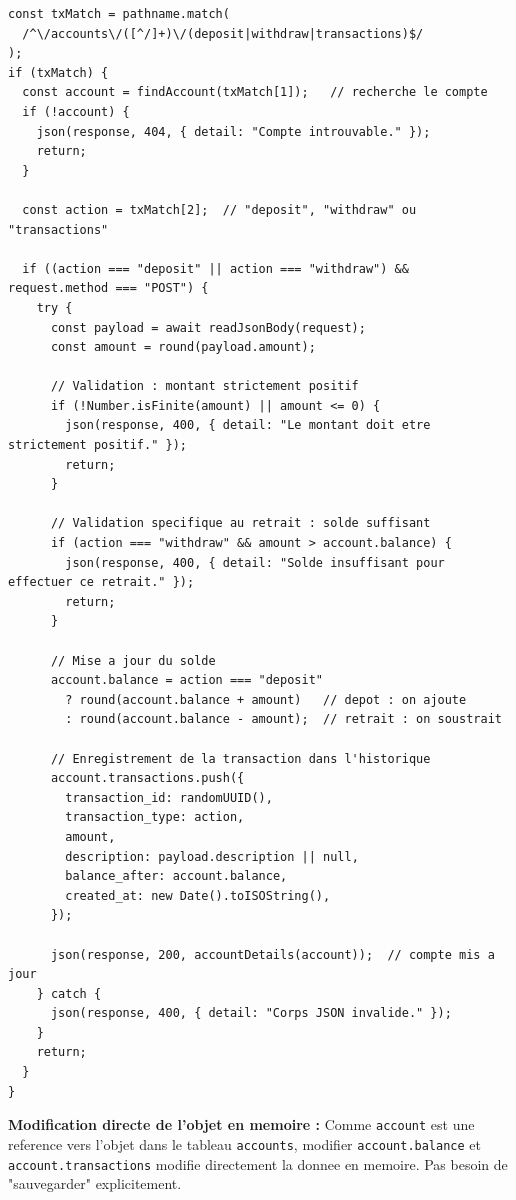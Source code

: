 \documentclass[12pt,a4paper]{article}
\begin{document}
\begin{lstlisting}[style=js, caption={server.js --- POST /accounts/\{id\}/(deposit|withdraw)}]
const txMatch = pathname.match(
  /^\/accounts\/([^/]+)\/(deposit|withdraw|transactions)$/
);
if (txMatch) {
  const account = findAccount(txMatch[1]);   // recherche le compte
  if (!account) {
    json(response, 404, { detail: "Compte introuvable." });
    return;
  }

  const action = txMatch[2];  // "deposit", "withdraw" ou "transactions"

  if ((action === "deposit" || action === "withdraw") && request.method === "POST") {
    try {
      const payload = await readJsonBody(request);
      const amount = round(payload.amount);

      // Validation : montant strictement positif
      if (!Number.isFinite(amount) || amount <= 0) {
        json(response, 400, { detail: "Le montant doit etre strictement positif." });
        return;
      }

      // Validation specifique au retrait : solde suffisant
      if (action === "withdraw" && amount > account.balance) {
        json(response, 400, { detail: "Solde insuffisant pour effectuer ce retrait." });
        return;
      }

      // Mise a jour du solde
      account.balance = action === "deposit"
        ? round(account.balance + amount)   // depot : on ajoute
        : round(account.balance - amount);  // retrait : on soustrait

      // Enregistrement de la transaction dans l'historique
      account.transactions.push({
        transaction_id: randomUUID(),
        transaction_type: action,
        amount,
        description: payload.description || null,
        balance_after: account.balance,
        created_at: new Date().toISOString(),
      });

      json(response, 200, accountDetails(account));  // compte mis a jour
    } catch {
      json(response, 400, { detail: "Corps JSON invalide." });
    }
    return;
  }
}
\end{lstlisting}

\begin{infobox}
\textbf{Modification directe de l'objet en memoire :} Comme \texttt{account} est une reference vers l'objet dans le tableau \texttt{accounts}, modifier \texttt{account.balance} et \texttt{account.transactions} modifie directement la donnee en memoire. Pas besoin de "sauvegarder" explicitement.
\end{infobox}
\end{document}
